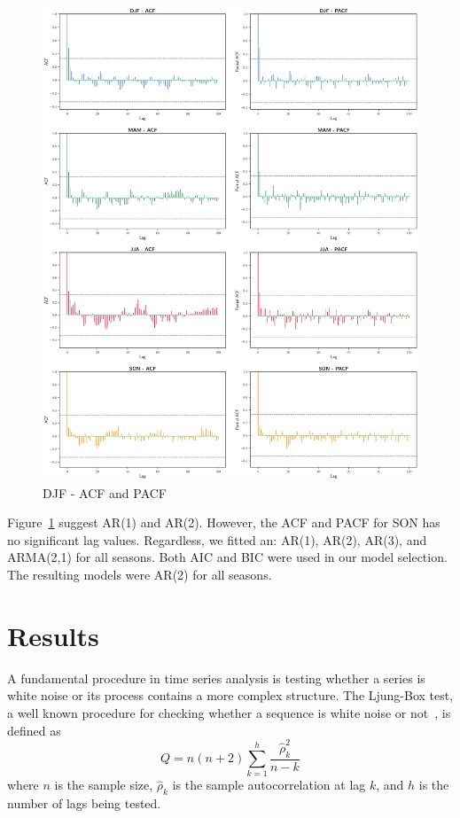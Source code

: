 \documentclass[12pt]{article}
\begin{document}
\begin{figure}[H]
  \includegraphics[width=1\textwidth,left]{figs/acfs}
  \caption{DJF - ACF and PACF}\label{acfs}
\end{figure}


Figure~\ref{acfs} suggest AR(1) and AR(2). However, the ACF and PACF for SON has no significant lag values. Regardless, we fitted an: AR(1), AR(2), AR(3), and ARMA(2,1) for all seasons. Both AIC and BIC were used in our model selection. The resulting models were AR(2) for all seasons.

\section{Results}
A fundamental procedure in time series analysis is testing whether a series is white noise or its process contains a more complex structure. The Ljung-Box test, a well known procedure for checking whether a sequence is white noise or not~\citep{ljung}, is defined as
$$Q = n(n+2)\sum_{k=1}^{h} \frac{\hat{\rho}_{k}^{2}}{n-k}$$
where $n$ is the sample size, $\hat{\rho}_k$ is the sample autocorrelation at lag $k$, and $h$ is the number of lags being tested.
\end{document}
